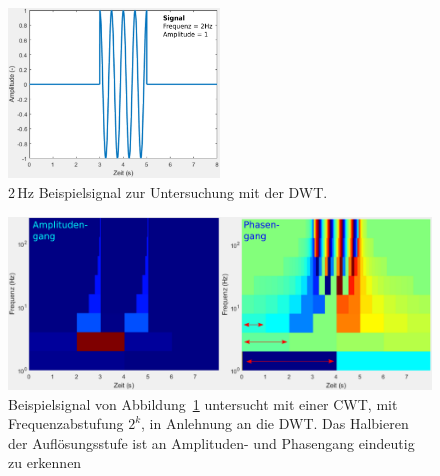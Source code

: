\begin{figure}
	\centering
	\includegraphics[width=0.5\textwidth]{papers/wavelets/images/17-3_AnwCwtFilterbankSig.png}
	\caption{2\,Hz Beispielsignal zur Untersuchung mit der DWT.
	\label{wavelet:fig:FilterbankAnwendung:beispiel}}
\end{figure}
\begin{figure}
	\centering
	\includegraphics[width=\textwidth]{papers/wavelets/images/17-3_CWT-FilterbankStyle.png}
	\caption{Beispielsignal von
	Abbildung~\ref{wavelet:fig:FilterbankAnwendung:beispiel} untersucht
	mit einer CWT, mit Frequenzabstufung $2^k$, in Anlehnung an die DWT.
	Das Halbieren der Auflösungsstufe ist an Amplituden- und Phasengang
	eindeutig zu erkennen}
	\label{wavelet:fig:FilterbankAnwendung}
\end{figure}

